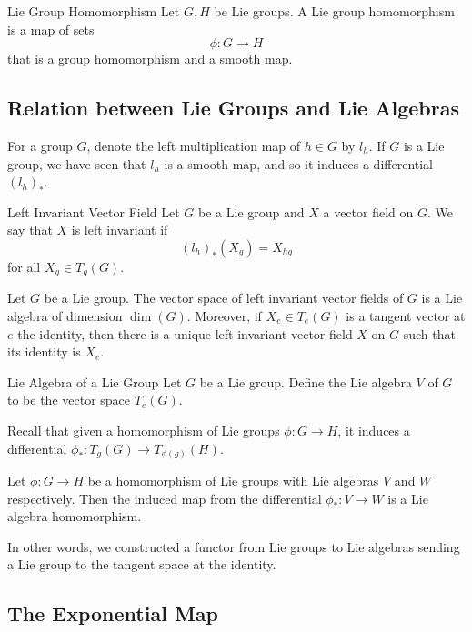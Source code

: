 \documentclass[a4paper]{article}
\begin{document}
\begin{defn}{Lie Group Homomorphism}{} Let $G,H$ be Lie groups. A Lie group homomorphism is a map of sets $$\phi:G\to H$$ that is a group homomorphism and a smooth map. 
\end{defn}

\subsection{Relation between Lie Groups and Lie Algebras}
For a group $G$, denote the left multiplication map of $h\in G$ by $l_h$. If $G$ is a Lie group, we have seen that $l_h$ is a smooth map, and so it induces a differential $(l_h)_\ast$. 

\begin{defn}{Left Invariant Vector Field}{} Let $G$ be a Lie group and $X$ a vector field on $G$. We say that $X$ is left invariant if $$(l_h)_\ast(X_g)=X_{hg}$$ for all $X_g\in T_g(G)$. 
\end{defn}

\begin{prp}{}{} Let $G$ be a Lie group. The vector space of left invariant vector fields of $G$ is a Lie algebra of dimension $\dim(G)$. Moreover, if $X_e\in T_e(G)$ is a tangent vector at $e$ the identity, then there is a unique left invariant vector field $X$ on $G$ such that its identity is $X_e$. 
\end{prp}

\begin{defn}{Lie Algebra of a Lie Group}{} Let $G$ be a Lie group. Define the Lie algebra $V$ of $G$ to be the vector space $T_e(G)$. 
\end{defn}

Recall that given a homomorphism of Lie groups $\phi:G\to H$, it induces a differential $\phi_\ast:T_g(G)\to T_{\phi(g)}(H)$. 

\begin{prp}{}{} Let $\phi:G\to H$ be a homomorphism of Lie groups with Lie algebras $V$ and $W$ respectively. Then the induced map from the differential $\phi_\ast:V\to W$ is a Lie algebra homomorphism. 
\end{prp}

In other words, we constructed a functor from Lie groups to Lie algebras sending a Lie group to the tangent space at the identity. 

\subsection{The Exponential Map}
\end{document}
